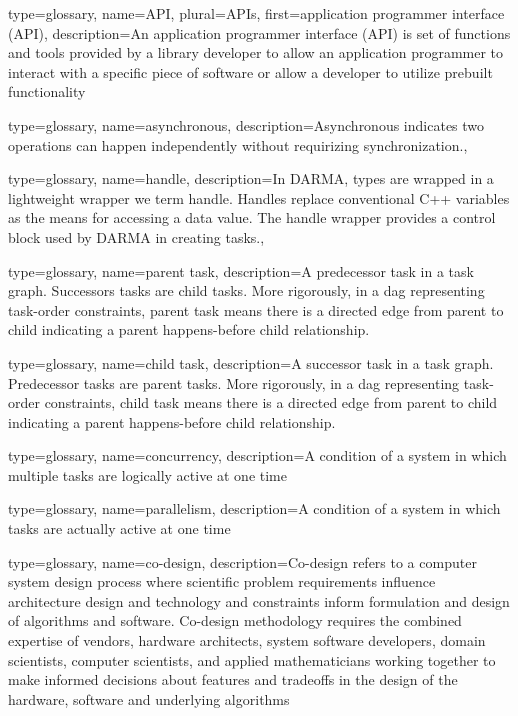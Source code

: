 {
  type=glossary,
  name={API},
  plural={APIs},
  first={application programmer interface (API)},
  description={An application programmer interface (API) is set of functions and tools provided by a library developer to allow an application programmer to interact with a specific piece of software or allow a developer to utilize prebuilt functionality}
}

{
  type=glossary,
  name={asynchronous},
  description={Asynchronous indicates two operations can happen independently without requirizing synchronization.},
}

{
  type=glossary,
  name={handle},
  description={In DARMA, types are wrapped in a lightweight wrapper we term handle.
    Handles replace conventional C++ variables as the means for accessing a data value.
    The handle wrapper provides a control block used by DARMA in creating tasks.},
}

{
  type=glossary,
  name={parent task},
  description={A predecessor task in a task graph. Successors tasks are \glspl{child task}.
    More rigorously, in a \gls{dag} representing task-order constraints,
    parent task means there is a directed edge from parent to child
    indicating a parent happens-before child relationship.}
}

{
  type=glossary,
  name={child task},
  description={A successor task in a task graph. Predecessor tasks are \glspl{parent task}.
    More rigorously, in a \gls{dag} representing task-order constraints,
    child task means there is a directed edge from parent to child
    indicating a parent happens-before child relationship.}
}

{
  type=glossary,
  name={concurrency},
  description={A condition of a system in which multiple tasks are logically
    active at one time}
}

{
  type=glossary,
  name={parallelism},
  description={A condition of a system in which tasks are actually active at
    one time}
}

{
  type=glossary,
  name=co-design,
  description={Co-design refers to a computer system design process where
    scientific problem requirements influence architecture design and
      technology and constraints inform formulation and design of algorithms
      and software.  Co-design methodology requires the combined expertise of
      vendors, hardware architects, system software developers, domain
      scientists, computer scientists, and applied mathematicians working
      together to make informed decisions about features and tradeoffs in the
      design of the hardware, software and underlying
      algorithms~\cite{co-design}}
}

